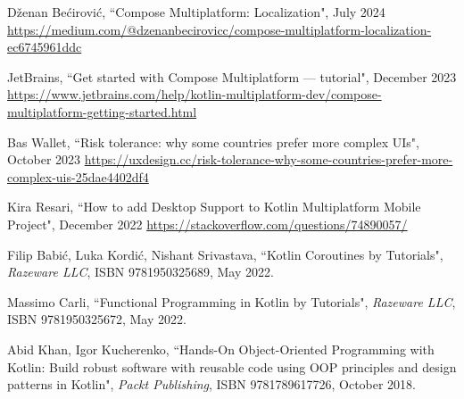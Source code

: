 
\begin{thebibliography}{100}

 Dženan Bećirović, ``Compose Multiplatform: Localization", July 2024
\href{https://medium.com/@dzenanbecirovicc/compose-multiplatform-localization-ec6745961ddc}{https://medium.com/@dzenanbecirovicc/compose-multiplatform-localization-ec6745961ddc}

 JetBrains, ``Get started with Compose Multiplatform — tutorial", December 2023
\href{https://www.jetbrains.com/help/kotlin-multiplatform-dev/compose-multiplatform-getting-started.html}{https://www.jetbrains.com/help/kotlin-multiplatform-dev/compose-multiplatform-getting-started.html}

 Bas Wallet, ``Risk tolerance: why some countries prefer more complex UIs", October 2023
\href{https://uxdesign.cc/risk-tolerance-why-some-countries-prefer-more-complex-uis-25dae4402df4}{https://uxdesign.cc/risk-tolerance-why-some-countries-prefer-more-complex-uis-25dae4402df4} 

 Kira Resari, ``How to add Desktop Support to Kotlin Multiplatform Mobile Project", December 2022
\href{https://stackoverflow.com/questions/74890057/}{https://stackoverflow.com/questions/74890057/}

 Filip Babić, Luka Kordić, Nishant Srivastava, ``Kotlin Coroutines by Tutorials", 
\emph{Razeware LLC}, ISBN 9781950325689, May 2022.

 Massimo Carli, ``Functional Programming in Kotlin by Tutorials", \emph{Razeware LLC}, 
ISBN 9781950325672, May 2022.

 Abid Khan, Igor Kucherenko, ``Hands-On Object-Oriented Programming with Kotlin: Build robust 
software with reusable code using OOP principles and design patterns in Kotlin", \emph{Packt Publishing}, 
ISBN 9781789617726, October 2018.

\end{thebibliography}
